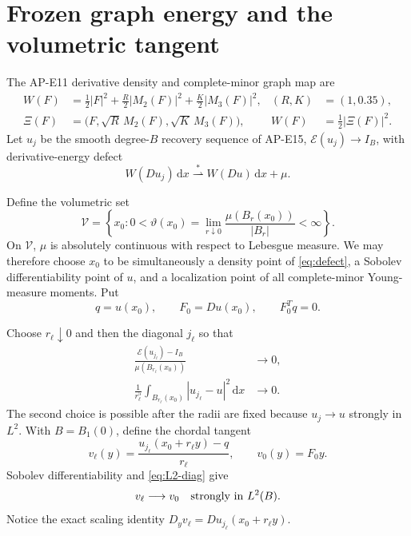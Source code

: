 \documentclass[10pt]{article}
\newcommand{\dd}{\,\mathrm d}
\newcommand{\cE}{\mathcal E}
\newcommand{\cV}{\mathcal V}
\begin{document}
\section{Frozen graph energy and the volumetric tangent}

The AP-E11 derivative density and complete-minor graph map are
\begin{align}
 W(F)&=\frac12|F|^2+\frac R2|M_2(F)|^2+\frac K2|M_3(F)|^2,
 & (R,K)&=(1,0.35),                                      \label{eq:W}\\
 \Xi(F)&=\bigl(F,\sqrt R\,M_2(F),\sqrt K\,M_3(F)\bigr),
 & W(F)&=\frac12|\Xi(F)|^2.                              \label{eq:Xi}
\end{align}
Let $u_j$ be the smooth degree-$B$ recovery sequence of AP-E15,
$\cE(u_j)\to I_B$, with derivative-energy defect
\begin{equation}
 W(Du_j)\dd x\stackrel{*}{\rightharpoonup}
 W(Du)\dd x+\mu .                                       \label{eq:defect}
\end{equation}

Define the volumetric set
\begin{equation}
 \cV=\left\{x_0:
 0<\vartheta(x_0)=
 \lim_{r\downarrow0}\frac{\mu(B_r(x_0))}{|B_r|}<\infty
 \right\}.                                               \label{eq:V}
\end{equation}
On $\cV$, $\mu$ is absolutely continuous with respect to Lebesgue measure.
We may therefore choose $x_0$ to be simultaneously a density point of
\eqref{eq:defect}, a Sobolev differentiability point of $u$, and a
localization point of all complete-minor Young-measure moments.  Put
\begin{equation}
 q=u(x_0),\qquad F_0=Du(x_0),\qquad F_0^Tq=0.             \label{eq:qF}
\end{equation}

Choose $r_\ell\downarrow0$ and then the diagonal $j_\ell$ so that
\begin{align}
 \frac{\cE(u_{j_\ell})-I_B}{{\mu(B_{r_\ell}(x_0))}}
 &\longrightarrow0,                                    \label{eq:global-diag}\\
 \frac1{r_\ell^5}\int_{B_{r_\ell}(x_0)}
 |u_{j_\ell}-u|^2\dd x&\longrightarrow0.                \label{eq:L2-diag}
\end{align}
The second choice is possible after the radii are fixed because
$u_j\to u$ strongly in $L^2$.  With $B=B_1(0)$, define the chordal tangent
\begin{equation}
 v_\ell(y)=\frac{u_{j_\ell}(x_0+r_\ell y)-q}{r_\ell},
 \qquad v_0(y)=F_0y.                                    \label{eq:v}
\end{equation}
Sobolev differentiability and \eqref{eq:L2-diag} give
\begin{equation}
 v_\ell\longrightarrow v_0\quad\hbox{strongly in }L^2(B).
 \label{eq:v-strong}
\end{equation}
Notice the exact scaling identity
$D_yv_\ell=Du_{j_\ell}(x_0+r_\ell y)$.
\end{document}
